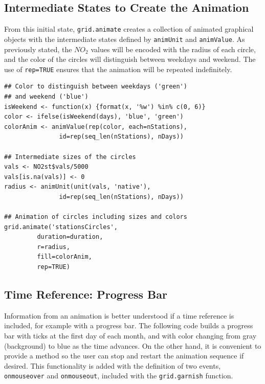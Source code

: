 \subsection{Intermediate States to Create the Animation}
\label{sec-4-2}
From this initial state, \texttt{grid.animate} creates a collection of
animated graphical objects with the intermediate states defined by
\texttt{animUnit} and \texttt{animValue}.  As previously stated, the $NO_2$ values
will be encoded with the radius of each circle, and the color of the
circles will distinguish between weekdays and weekend.  The use of
\texttt{rep=TRUE} ensures that the animation will be repeated indefinitely.


\lstset{language=R,numbers=none}
\begin{lstlisting}
## Color to distinguish between weekdays ('green')
## and weekend ('blue')
isWeekend <- function(x) {format(x, '%w') %in% c(0, 6)}
color <- ifelse(isWeekend(days), 'blue', 'green')
colorAnim <- animValue(rep(color, each=nStations),
		       id=rep(seq_len(nStations), nDays))

## Intermediate sizes of the circles
vals <- NO2st$vals/5000
vals[is.na(vals)] <- 0
radius <- animUnit(unit(vals, 'native'),
		       id=rep(seq_len(nStations), nDays))                     

## Animation of circles including sizes and colors
grid.animate('stationsCircles',
	     duration=duration,
	     r=radius,
	     fill=colorAnim,
	     rep=TRUE)
\end{lstlisting}
\subsection{Time Reference: Progress Bar}
\label{sec-4-3}
Information from an animation is better understood if a time
reference is included, for example with a progress bar.  The following
code builds a progress bar with ticks at the first day of each
month, and with color changing from gray (background) to blue as
the time advances.  On the other hand, it is convenient to provide
a method so the user can stop and restart the animation sequence
if desired.  This functionality is added with the definition of
two events, \texttt{onmouseover} and \texttt{onmouseout}, included with the
\texttt{grid.garnish} function.


